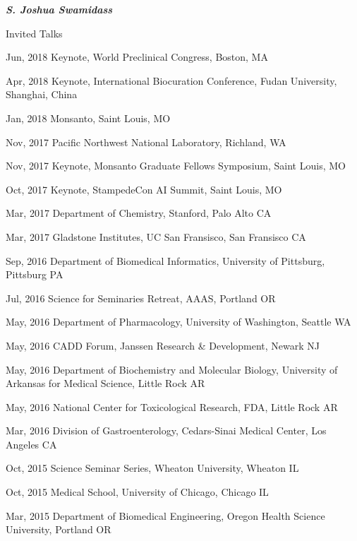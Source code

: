 \documentclass[10pt]{article}
\begin{document}
\begin{cv}{\huge \it \bfseries S. Joshua Swamidass}
\begin{cvlist}{ Invited Talks}
\item[Jun, 2018] Keynote, World Preclinical Congress, Boston, MA
\item[Apr, 2018] Keynote, International Biocuration Conference, Fudan University, Shanghai, China
\item[Jan, 2018] Monsanto, Saint Louis, MO
\item[Nov, 2017] Pacific Northwest National Laboratory, Richland, WA
\item[Nov, 2017] Keynote, Monsanto Graduate Fellows Symposium, Saint Louis, MO
\item[Oct, 2017] Keynote, StampedeCon AI Summit, Saint Louis, MO
\item[Mar, 2017] Department of Chemistry, Stanford, Palo Alto CA
\item[Mar, 2017] Gladstone Institutes, UC San Fransisco, San Fransisco CA
\item[Sep, 2016] Department of Biomedical Informatics, University of Pittsburg, Pittsburg PA
\item[Jul, 2016] Science for Seminaries Retreat, AAAS, Portland OR
\item[May, 2016] Department of Pharmacology, University of Washington, Seattle WA
\item[May, 2016] CADD Forum, Janssen Research \& Development, Newark NJ
\item[May, 2016] Department of Biochemistry and Molecular Biology, University of Arkansas for Medical Science, Little Rock AR
\item[May, 2016] National Center for Toxicological Research, FDA, Little Rock AR
\item[Mar, 2016] Division of Gastroenterology, Cedars-Sinai Medical Center, Los Angeles CA
\item[Oct, 2015] Science Seminar Series, Wheaton University, Wheaton IL
\item[Oct, 2015] Medical School,  University of Chicago, Chicago IL
\item[Mar, 2015] Department of Biomedical Engineering, Oregon Health Science University, Portland OR
\end{cvlist}



\end{cv}
\end{document}
